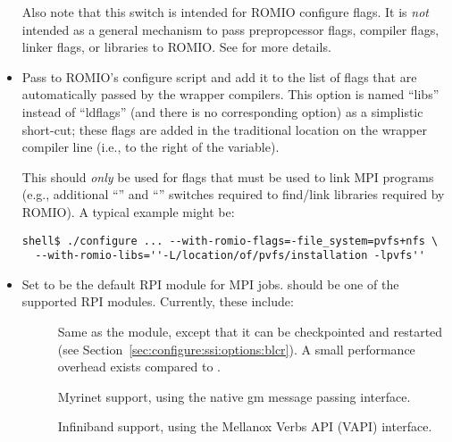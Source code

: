 \begin{itemize}
  Also note that this switch is intended for ROMIO configure flags.
  It is {\em not} intended as a general mechanism to pass
  prepropcessor flags, compiler flags, linker flags, or libraries to
  ROMIO.  See  for more details.

\item {}
  
  Pass  to ROMIO's configure script and add it to the list
  of flags that are automatically passed by the wrapper compilers.
  This option is named ``libs'' instead of ``ldflags'' (and there is
  no corresponding  option) as a
  simplistic short-cut; these flags are added in the traditional
   location on the wrapper compiler line (i.e., to the right
  of the  variable).

  This should {\em only} be used for flags that must be used to link
  MPI programs (e.g., additional ``'' and ``''
  switches required to find/link libraries required by ROMIO).  A
  typical example might be:

  \lstset{style=lam-cmdline}
  \begin{lstlisting}
shell$ ./configure ... --with-romio-flags=-file_system=pvfs+nfs \
  --with-romio-libs=''-L/location/of/pvfs/installation -lpvfs''
  \end{lstlisting}


\item {}
  
  Set  to be the default RPI module for MPI jobs.
  \var{MODULE\_\-NAME} should be one of the supported RPI modules.
  Currently, these include:
  
  \begin{description}
  \item[] Same as the  module, except that it can
    be checkpointed and restarted (see
    Section~\ref{sec:configure:ssi:options:blcr}).  A small
    performance overhead exists compared to .

  \item[] Myrinet support, using the native gm message
    passing interface.

  \item[] Infiniband support, using the Mellanox Verbs API
    (VAPI) interface.


\end{description}
\end{itemize}
